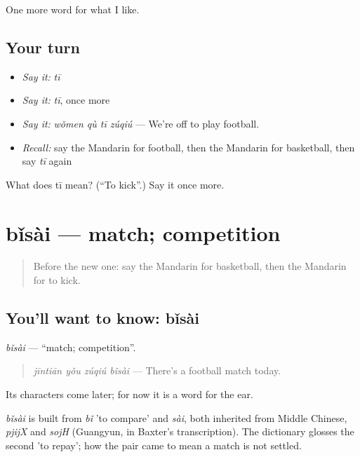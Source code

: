 \begin{grammarlens}[title={What you've built}]
One more word for what I like.
\end{grammarlens}

\subsection*{Your turn}
\begin{itemize}
\raggedright
  \item \emph{Say it:} \emph{tī}
  \item \emph{Say it:} \emph{tī}, once more
  \item \emph{Say it:} \emph{wǒmen qù tī zúqiú} — We're off to play football.
  \item \emph{Recall:} say the Mandarin for football, then the Mandarin for basketball, then say \emph{tī} again
\end{itemize}

\begin{tcolorbox}[breakable,colback=teal!4,colframe=teal!35!black,title={Before you move on}]
What does tī mean? (\textquotedblleft{}To kick\textquotedblright{}.) Say it once more.
\end{tcolorbox}
\section[bǐsài]{bǐsài — match; competition}

\label{lesson:ZH-C135-bisai}



\begin{quote}
Before the new one: say the Mandarin for basketball, then the Mandarin for to kick.
\end{quote}

\subsection*{You'll want to know: bǐsài}
\emph{bǐsài} — \textquotedblleft{}match; competition\textquotedblright{}.

\begin{quote}
\emph{jīntiān yǒu zúqiú bǐsài} — There's a football match today.
\end{quote}

Its characters come later; for now it is a word for the ear.

\begin{cousinweb}
\emph{bǐsài} is built from \emph{bǐ} 'to compare' and \emph{sài}, both inherited from Middle Chinese, \emph{pjijX} and \emph{sojH} (Guangyun, in Baxter's transcription). The dictionary glosses the second 'to repay'; how the pair came to mean a match is not settled.
\end{cousinweb}

